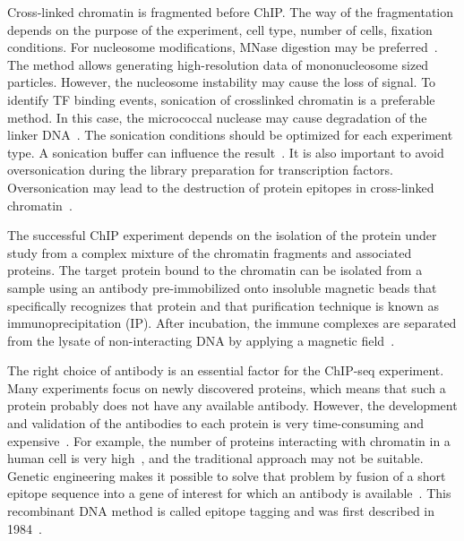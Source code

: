 Cross-linked chromatin is fragmented before ChIP. 
The way of the fragmentation depends on the purpose of the experiment, cell type, number of cells, fixation conditions. 
For nucleosome modifications, MNase digestion may be preferred~\cite{kidder2011chip}.  
The method allows generating high-resolution data of mononucleosome sized particles. 
However, the nucleosome instability may cause the loss of signal.
To identify TF binding events, sonication of crosslinked chromatin is a preferable method. 
In this case, the micrococcal nuclease may cause degradation of the linker DNA~\cite{kidder2011chip}.
The sonication conditions should be optimized for each experiment type. 
A sonication buffer can influence the result~\cite{steger2008dot1l}. 
It is also important to avoid oversonication during the library preparation for transcription factors. 
Oversonication may lead to the destruction of protein epitopes in cross-linked chromatin~\cite{ostrow2015chip}. 




The successful ChIP experiment depends on the isolation of the protein under study from a complex mixture of the chromatin fragments and associated proteins. 
The target protein bound to the chromatin can be isolated from a sample using an antibody pre-immobilized onto insoluble magnetic beads that specifically recognizes that protein and that purification technique is known as immunoprecipitation (IP). 
After incubation, the immune complexes are separated from the lysate of non-interacting DNA by applying a magnetic field~\cite{slovakova2005use}.

The right choice of antibody is an essential factor for the ChIP-seq experiment. 
Many experiments focus on newly discovered proteins, which means that such a protein probably does not have any available antibody. 
However, the development and validation of the antibodies to each protein is very time-consuming and expensive~\cite{jarvik1998epitope}. 
For example, the number of proteins interacting with chromatin in a human cell is very high~\cite{ramani2005consolidating}, and the traditional approach may not be suitable.
Genetic engineering makes it possible to solve that problem by fusion of a short epitope sequence into a gene of interest for which an antibody is available~\cite{jarvik1998epitope,brizzard2008epitope,goldberg2010distinct}. 
This recombinant DNA method is called epitope tagging and was first described in 1984~\cite{munro1984use}. 





